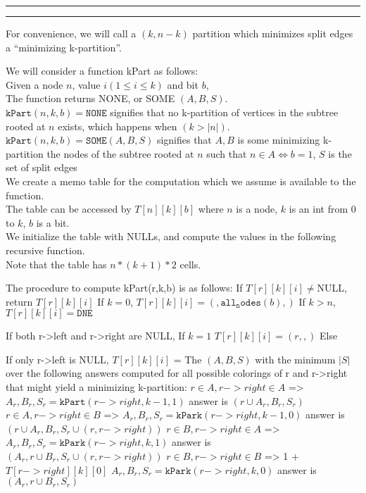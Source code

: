 \documentclass[11pt]{article}
\newcommand{\question}[2] {\vspace{.25in} \hrule\vspace{0.5em}
\noindent{\bf #1: #2} \vspace{0.5em}
\hrule \vspace{.10in}}
\begin{document}
\question{3}{Color Me Red, Color Me Blue}

For convenience, we will call a $(k,n-k)$ partition which minimizes split edges a ``minimizing k-partition''.

We will consider a function kPart as follows:\\

Given a node $n$, value $i (1 \leq i \leq k)$ and bit $b$,\\
The function returns NONE, or SOME $(A,B,S)$.\\

$\mathtt{kPart}(n,k,b) = \mathtt{NONE}$ signifies that no k-partition of vertices in the subtree rooted at $n$ exists, which happens when $(k > |n|)$. \\
$\mathtt{kPart}(n,k,b) = \mathtt{SOME}(A,B,S)$ signifies that $A,B$ is some minimizing k-partition the nodes of the subtree rooted at $n$ such that $n \in A \iff b = 1$, $S$ is the set of split edges\\


We create a memo table for the computation which we assume is available to the function.\\
The table can be accessed by $T[n][k][b]$ where $n$ is a node, $k$ is an int from 0 to $k$, $b$ is a bit.\\
We initialize the table with NULLs, and compute the values in the following recursive function.\\
Note that the table has $n*(k+1)*2$ cells.

The procedure to compute kPart(r,k,b) is as follows:
    If $T[r][k][i] \neq \text{NULL}$,
       return $T[r][k][i]$
    If $k = 0$,
       $T[r][k][i] = ({}, {\mathtt{all_nodes}(b)}, {})$
    If $k > n$,
       $T[r][k][i] = \mathtt{DNE}$

    If both r->left and r->right are NULL,
        If $k=1$
            $T[r][k][i] = ({r}, {}, {})$
        Else

    If only r->left is NULL,
        $T[r][k][i]$ = The $(A,B,S)$ with the minimum $|S|$ over the following answers computed for all possible colorings of r and r->right that might yield a minimizing k-partition:
          $r \in A, r->right \in A$ =>
            $A_r, B_r, S_r = \mathtt{kPart}(r->right,k-1,1)$
            answer is $({r} \cup A_r, B_r, S_r)$
          $r \in A, r->right \in B$ =>
            $A_r, B_r, S_r = \mathtt{kPark}(r->right,k-1,0)$
            answer is $({r} \cup A_r, B_r, S_r \cup {(r, r->right)})$
          $r \in B, r->right \in A$ =>
            $A_r, B_r, S_r = \mathtt{kPark}(r->right,k,1)$
            answer is $(A_r,{r} \cup B_r, S_r \cup {(r, r->right)})$
          $r \in B, r->right \in B$ => 1 + $T[r->right][k][0]$
            $A_r, B_r, S_r = \mathtt{kPark}(r->right,k,0)$
            answer is $(A_r,{r} \cup B_r, S_r)$
\end{document}
